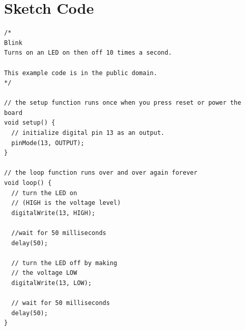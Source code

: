 \newpage
\section*{Sketch Code}
\label{sketch:exp5}
\begin{lstlisting}
/*
Blink
Turns on an LED on then off 10 times a second.

This example code is in the public domain.
*/

// the setup function runs once when you press reset or power the board
void setup() {
  // initialize digital pin 13 as an output.
  pinMode(13, OUTPUT);
}

// the loop function runs over and over again forever
void loop() {
  // turn the LED on 
  // (HIGH is the voltage level)
  digitalWrite(13, HIGH);
	
  //wait for 50 milliseconds
  delay(50);
	
  // turn the LED off by making 
  // the voltage LOW
  digitalWrite(13, LOW);    
	            
  // wait for 50 milliseconds              
  delay(50);
}
\end{lstlisting}